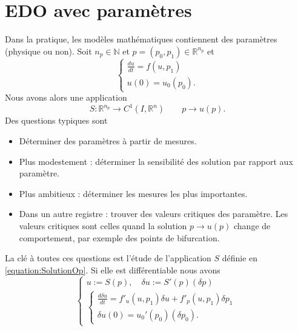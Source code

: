 \documentclass[11pt,a4paper]{article}
\newcommand{\N}{\mathbb N}
\newcommand{\R}{\mathbb R}
\begin{document}
\section{EDO avec paramètres}\label{sec:}
%
Dans la pratique, les modèles mathématiques contiennent des paramètres (physique ou non). Soit $n_p\in\N$ et $p=(p_0,p_1)\in \R^{n_p}$ et
%
\begin{equation}\label{equation:EDOParam}
\left\{
\begin{aligned}
\frac{du}{dt} = f(u,p_1)\\
u(0) = u_0(p_0).
\end{aligned}
\right.
\end{equation}
%
Nous avons alors une application
%
\begin{equation}\label{equation:SolutionOp}
S:\R^{n_p}\to C^1(I,\R^n)\qquad p \to u(p).
\end{equation}
%
%
Des questions typiques sont
\begin{itemize}
\item Déterminer des paramètres à partir de mesures.
\item Plus modestement : déterminer la sensibilité des solution par rapport aux paramètre.
\item Plus ambitieux : déterminer les mesures les plus importantes.
\item Dans un autre registre : trouver des valeurs critiques des paramètre. Les valeurs critiques sont celles quand la solution $p\to u(p)$ change de comportement, par exemple des points de bifurcation.
\end{itemize}
%
La clé à toutes ces questions est l'étude de l'application $S$ définie en \eqref{equation:SolutionOp}. 
Si elle est différentiable nous avons
%
\begin{equation}\label{equation:}
\left\{
\begin{aligned}
u:= S(p), \quad \delta u := S'(p)(\delta p)\\
%
\left\{
\begin{aligned}
\frac{d\delta u}{dt} = f'_u(u,p_1)\delta u + f'_p(u,p_1)\delta p_1\\
\delta u(0) = u_0'(p_0)(\delta p_0).
\end{aligned}
\right.
%
\end{aligned}
\right.
\end{equation}
%
%
%



\end{document}
